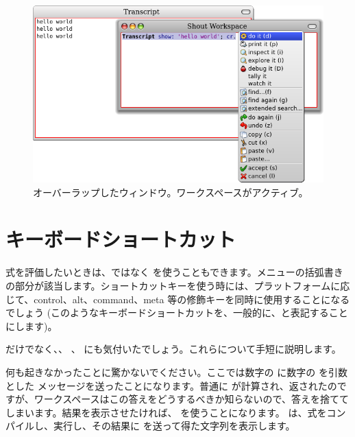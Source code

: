 \documentclass[a4paper,10pt,twoside]{book}
\begin{document}
\begin{figure}[htb]
\centerline {\includegraphics[width=\textwidth]{HelloWorld}}
\caption{オーバーラップしたウィンドウ。ワークスペースがアクティブ。}
\end{figure}

\section{キーボードショートカット}

式を評価したいときは、\actclick ではなく を使うこともできます。メニューの括弧書きの部分が該当します。ショートカットキーを使う時には、プラットフォームに応じて、control、alt、command、meta 等の修飾キーを同時に使用することになるでしょう
(このようなキーボードショートカットを、一般的に、と表記することにします)。


 だけでなく、、 、  にも気付いたでしょう。これらについて手短に説明します。


何も起きなかったことに驚かないでください。ここでは数字の  に数字の  を引数とした \ct{+} メッセージを送ったことになります。普通に  が計算され、返されたのですが、ワークスペースはこの答えをどうするべきか知らないので、答えを捨ててしまいます。結果を表示させたければ、 を使うことになります。 は、式をコンパイルし、実行し、その結果に  を送って得た文字列を表示します。
\end{document}
